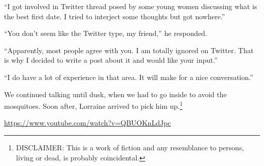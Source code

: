 ``I got involved in Twitter thread posed by some young women discussing what is the best first date. I tried to interject some thoughts but got nowhere.''

``You don't seem like the Twitter type, my friend,'' he responded.

``Apparently, most people agree with you. I am totally ignored on Twitter. That is why I decided to write a post about it and would like your input.''

``I do have a lot of experience in that area. It will make for a nice conversation.''

We continued talking until dusk, when we had to go inside to avoid the mosquitoes. Soon after, Lorraine arrived to pick him up.\footnote{DISCLAIMER: This is a work of fiction and any resemblance to persons, living or dead, is probably coincidental.} 

\url{https://www.youtube.com/watch?v=QBUOKnLdJpc}


